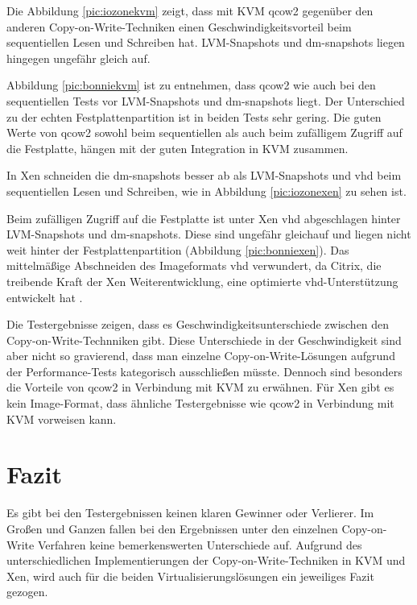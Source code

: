 Die Abbildung \ref{pic:iozonekvm} zeigt, dass mit KVM qcow2 gegenüber den anderen Copy-on-Write-Techniken einen Geschwindigkeitsvorteil beim sequentiellen Lesen und Schreiben hat. LVM-Snapshots und dm-snapshots liegen hingegen ungefähr gleich auf.

Abbildung \ref{pic:bonniekvm} ist zu entnehmen, dass qcow2 wie auch bei den sequentiellen Tests vor LVM-Snapshots und dm-snapshots liegt. Der Unterschied zu der echten Festplattenpartition ist in beiden Tests sehr gering. Die guten Werte von qcow2 sowohl beim sequentiellen als auch beim zufälligem Zugriff auf die Festplatte, hängen mit der guten Integration in KVM zusammen.

In Xen schneiden die dm-snapshots besser ab als LVM-Snapshots und vhd beim sequentiellen Lesen und Schreiben, wie in Abbildung \ref{pic:iozonexen} zu sehen ist. 

Beim zufälligen Zugriff auf die Festplatte ist unter Xen vhd abgeschlagen hinter LVM-Snapshots und dm-snapshots. Diese sind ungefähr gleichauf und liegen nicht weit hinter der Festplattenpartition (Abbildung \ref{pic:bonniexen}). Das mittelmäßige Abschneiden des Imageformats vhd verwundert, da Citrix, die treibende Kraft der Xen Weiterentwicklung, eine optimierte vhd-Unterstützung entwickelt hat \cite{citrixvhd}. 

Die Testergebnisse zeigen, dass es Geschwindigkeitsunterschiede zwischen den Copy-on-Write-Technniken gibt. Diese Unterschiede in der Geschwindigkeit sind aber nicht so gravierend, dass man einzelne Copy-on-Write-Lösungen aufgrund der Performance-Tests kategorisch ausschließen müsste. Dennoch sind besonders die Vorteile von qcow2 in Verbindung mit KVM zu erwähnen. Für Xen gibt es kein Image-Format, dass ähnliche Testergebnisse wie qcow2 in Verbindung mit KVM vorweisen kann. 

\section{Fazit}
Es gibt bei den Testergebnissen keinen klaren Gewinner oder Verlierer. Im Großen und Ganzen fallen bei den Ergebnissen unter den einzelnen Copy-on-Write Verfahren keine bemerkenswerten Unterschiede auf. Aufgrund des unterschiedlichen Implementierungen der Copy-on-Write-Techniken in KVM und Xen, wird auch für die beiden Virtualisierungslösungen ein jeweiliges Fazit gezogen.

